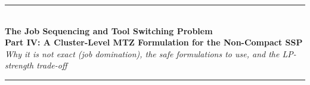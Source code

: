 \documentclass[11pt,a4paper]{article}
\theoremstyle{plain}
\theoremstyle{definition}
\begin{document}

\begin{center}
	{\color{navyblue}\rule{\textwidth}{2pt}}\\[0.4cm]
	{\LARGE\bfseries\color{navyblue}The Job Sequencing and Tool Switching Problem}\\[0.2cm]
	{\large\bfseries\color{navyblue}Part IV: A Cluster-Level MTZ Formulation for the Non-Compact SSP}\\[0.1cm]
	{\large\itshape\color{midblue}Why it is not exact (job domination), the safe formulations to use, and the LP-strength trade-off}\\[0.3cm]
	{\color{navyblue}\rule{\textwidth}{2pt}}
\end{center}

\vspace{0.3cm}
\end{document}
